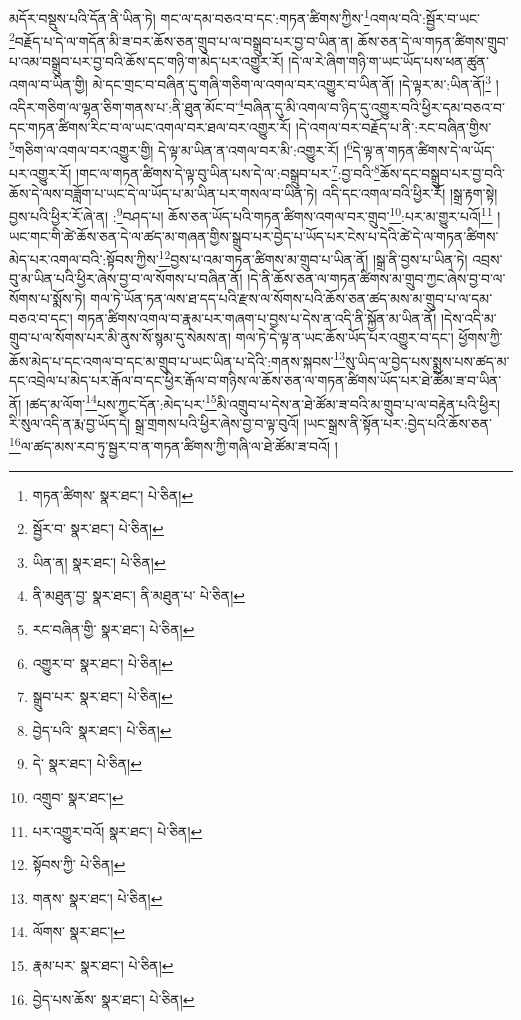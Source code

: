 མདོར་བསྡུས་པའི་དོན་ནི་ཡིན་ཏེ། གང་ལ་དམ་བཅའ་བ་དང་:གཏན་ཚིགས་ཀྱིས་\footnote{གཏན་ཚིགས་  སྣར་ཐང་།  པེ་ཅིན། }འགལ་བའི་:སྦྱོར་བ་ཡང་\footnote{སྦྱོར་བ་  སྣར་ཐང་།  པེ་ཅིན། }བརྗོད་པ་དེ་ལ་གདོན་མི་ཟ་བར་ཆོས་ཅན་གྲུབ་པ་ལ་བསྒྲུབ་པར་བྱ་བ་ཡིན་ན། ཆོས་ཅན་དེ་ལ་གཏན་ཚིགས་གྲུབ་པ་འམ་བསྒྲུབ་པར་བྱ་བའི་ཆོས་དང་གཉི་ག་མེད་པར་འགྱུར་རོ། །དེ་ལ་རེ་ཞིག་གཉི་ག་ཡང་ཡོད་པས་ཕན་ཚུན་འགལ་བ་ཡིན་གྱི། མེ་དང་གྲང་བ་བཞིན་དུ་གཞི་གཅིག་ལ་འགལ་བར་འགྱུར་བ་ཡིན་ནོ། །དེ་ལྟར་མ་:ཡིན་ནོ།\footnote{ཡིན་ན།  སྣར་ཐང་།  པེ་ཅིན། } །འདིར་གཅིག་ལ་ལྷན་ཅིག་གནས་པ་:ནི་ཐུན་མོང་བ་\footnote{ནི་མཐུན་བྱ་  སྣར་ཐང་། ནི་མཐུན་པ་  པེ་ཅིན། }བཞིན་དུ་མི་འགལ་བ་ཉིད་དུ་འགྱུར་བའི་ཕྱིར་དམ་བཅའ་བ་དང་གཏན་ཚིགས་རིང་བ་ལ་ཡང་འགལ་བར་ཐལ་བར་འགྱུར་རོ། །དེ་འགལ་བར་བརྗོད་པ་ནི་:རང་བཞིན་གྱིས་\footnote{རང་བཞིན་གྱི་  སྣར་ཐང་།  པེ་ཅིན། }གཅིག་ལ་འགལ་བར་འགྱུར་གྱི། དེ་ལྟ་མ་ཡིན་ན་འགལ་བར་མི་:འགྱུར་རོ། །\footnote{འགྱུར་བ་  སྣར་ཐང་།  པེ་ཅིན། }དེ་ལྟ་ན་གཏན་ཚིགས་དེ་ལ་ཡོད་པར་འགྱུར་རོ། །གང་ལ་གཏན་ཚིགས་དེ་ལྟ་བུ་ཡིན་པས་དེ་ལ་:བསྒྲུབ་པར་\footnote{སྒྲུབ་པར་  སྣར་ཐང་།  པེ་ཅིན། }:བྱ་བའི་\footnote{བྱེད་པའི་  སྣར་ཐང་།  པེ་ཅིན། }ཆོས་དང་བསྒྲུབ་པར་བྱ་བའི་ཆོས་དེ་ལས་བཟློག་པ་ཡང་དེ་ལ་ཡོད་པ་མ་ཡིན་པར་གསལ་བ་ཡིན་ཏེ། འདི་དང་འགལ་བའི་ཕྱིར་རོ། །སྒྲ་རྟག་སྟེ། བྱས་པའི་ཕྱིར་རོ་ཞེ་ན། :\footnote{དེ་  སྣར་ཐང་།  པེ་ཅིན། }བཤད་པ། ཆོས་ཅན་ཡོད་པའི་གཏན་ཚིགས་འགལ་བར་གྲུབ་\footnote{འགྲུབ་  སྣར་ཐང་། }:པར་མ་གྱུར་པའོ།\footnote{པར་འགྱུར་བའོ།  སྣར་ཐང་།  པེ་ཅིན། } །ཡང་གང་གི་ཚེ་ཆོས་ཅན་དེ་ལ་ཚད་མ་གཞན་གྱིས་སྒྲུབ་པར་བྱེད་པ་ཡོད་པར་ངེས་པ་དེའི་ཚེ་དེ་ལ་གཏན་ཚིགས་མེད་པར་འགལ་བའི་:སྟོབས་ཀྱིས་\footnote{སྟོབས་ཀྱི་  པེ་ཅིན། }བྱས་པ་འམ་གཏན་ཚིགས་མ་གྲུབ་པ་ཡིན་ནོ། །སྒྲ་ནི་བྱས་པ་ཡིན་ཏེ། འབྲས་བུ་མ་ཡིན་པའི་ཕྱིར་ཞེས་བྱ་བ་ལ་སོགས་པ་བཞིན་ནོ། །དེ་ནི་ཆོས་ཅན་ལ་གཏན་ཚིགས་མ་གྲུབ་ཀྱང་ཞེས་བྱ་བ་ལ་སོགས་པ་སྨོས་ཏེ། གལ་ཏེ་ཡོན་ཏན་ལས་ཐ་དད་པའི་རྫས་ལ་སོགས་པའི་ཆོས་ཅན་ཚད་མས་མ་གྲུབ་པ་ལ་དམ་བཅའ་བ་དང་། གཏན་ཚིགས་འགལ་བ་རྣམ་པར་གཞག་པ་བྱས་པ་དེས་ན་འདི་ནི་སྐྱོན་མ་ཡིན་ནོ། །དེས་འདི་མ་གྲུབ་པ་ལ་སོགས་པར་མི་ནུས་སོ་སྙམ་དུ་སེམས་ན། གལ་ཏེ་དེ་ལྟ་ན་ཡང་ཆོས་ཡོད་པར་འགྱུར་བ་དང་། ཕྱོགས་ཀྱི་ཆོས་མེད་པ་དང་འགལ་བ་དང་མ་གྲུབ་པ་ཡང་ཡིན་པ་དེའི་:གནས་སྐབས་\footnote{གནས་  སྣར་ཐང་།  པེ་ཅིན། }སུ་ཡིད་ལ་བྱེད་པས་སྨྲས་པས་ཚད་མ་དང་འབྲེལ་པ་མེད་པར་རྒོལ་བ་དང་ཕྱིར་རྒོལ་བ་གཉིས་ལ་ཆོས་ཅན་ལ་གཏན་ཚིགས་ཡོད་པར་ཐེ་ཚོམ་ཟ་བ་ཡིན་ནོ། །ཚད་མ་ལོག་\footnote{ལོགས་  སྣར་ཐང་། }པས་ཀྱང་དོན་:མེད་པར་\footnote{རྣམ་པར་  སྣར་ཐང་།  པེ་ཅིན། }མི་འགྲུབ་པ་དེས་ན་ཐེ་ཚོམ་ཟ་བའི་མ་གྲུབ་པ་ལ་བརྟེན་པའི་ཕྱིར། རི་སུལ་འདི་ན་རྨ་བྱ་ཡོད་དེ། སྒྲ་གྲགས་པའི་ཕྱིར་ཞེས་བྱ་བ་ལྟ་བུའོ། །ཡང་སྒྲས་ནི་སྟོན་པར་:བྱེད་པའི་ཆོས་ཅན་\footnote{བྱེད་པས་ཆོས་  སྣར་ཐང་།  པེ་ཅིན། }ལ་ཚད་མས་རབ་ཏུ་སྦྱར་བ་ན་གཏན་ཚིགས་ཀྱི་གཞི་ལ་ཐེ་ཚོམ་ཟ་བའོ། །
